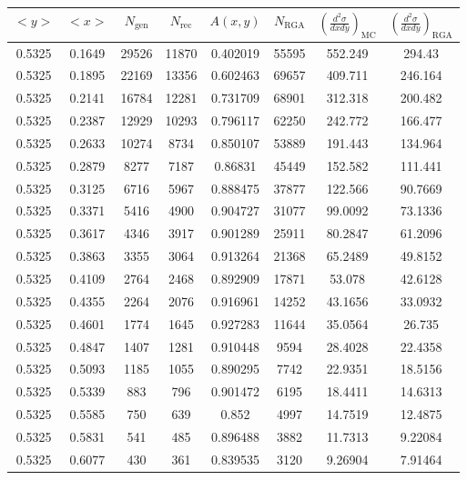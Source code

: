\begin{table}[h!]
	\centering
	\begin{tabular}{ |c|c|c|c|c|c|c|c| } 
		\hline
		$<y>$ & $<x>$ & $N_{\mathrm{gen}}$ & $N_{\mathrm{rec}}$ & $A(x,y)$ & $N_{\mathrm{RGA}}$ & $\left( \frac{d^2\sigma}{dxdy} \right)_{\mathrm{MC}}$ & $\left( \frac{d^2\sigma}{dxdy} \right)_{\mathrm{RGA}}$ \\
		\hline
		0.5325 & 0.1649 & 29526 & 11870 & 0.402019 & 55595 & 552.249 & 294.43 \\ 
		0.5325 & 0.1895 & 22169 & 13356 & 0.602463 & 69657 & 409.711 & 246.164 \\ 
		0.5325 & 0.2141 & 16784 & 12281 & 0.731709 & 68901 & 312.318 & 200.482 \\ 
		0.5325 & 0.2387 & 12929 & 10293 & 0.796117 & 62250 & 242.772 & 166.477 \\ 
		0.5325 & 0.2633 & 10274 & 8734 & 0.850107 & 53889 & 191.443 & 134.964 \\ 
		0.5325 & 0.2879 & 8277 & 7187 & 0.86831 & 45449 & 152.582 & 111.441 \\ 
		0.5325 & 0.3125 & 6716 & 5967 & 0.888475 & 37877 & 122.566 & 90.7669 \\ 
		0.5325 & 0.3371 & 5416 & 4900 & 0.904727 & 31077 & 99.0092 & 73.1336 \\ 
		0.5325 & 0.3617 & 4346 & 3917 & 0.901289 & 25911 & 80.2847 & 61.2096 \\ 
		0.5325 & 0.3863 & 3355 & 3064 & 0.913264 & 21368 & 65.2489 & 49.8152 \\ 
		0.5325 & 0.4109 & 2764 & 2468 & 0.892909 & 17871 & 53.078 & 42.6128 \\ 
		0.5325 & 0.4355 & 2264 & 2076 & 0.916961 & 14252 & 43.1656 & 33.0932 \\ 
		0.5325 & 0.4601 & 1774 & 1645 & 0.927283 & 11644 & 35.0564 & 26.735 \\ 
		0.5325 & 0.4847 & 1407 & 1281 & 0.910448 & 9594 & 28.4028 & 22.4358 \\ 
		0.5325 & 0.5093 & 1185 & 1055 & 0.890295 & 7742 & 22.9351 & 18.5156 \\ 
		0.5325 & 0.5339 & 883 & 796 & 0.901472 & 6195 & 18.4411 & 14.6313 \\ 
		0.5325 & 0.5585 & 750 & 639 & 0.852 & 4997 & 14.7519 & 12.4875 \\ 
		0.5325 & 0.5831 & 541 & 485 & 0.896488 & 3882 & 11.7313 & 9.22084 \\ 
		0.5325 & 0.6077 & 430 & 361 & 0.839535 & 3120 & 9.26904 & 7.91464 \\ 
		\hline
	\end{tabular}
\end{table}

